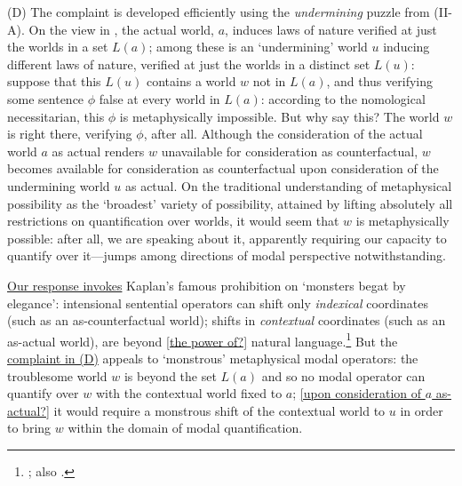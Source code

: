 \documentclass[12pt]{article}
\begin{document}
(D) The complaint is developed efficiently using the \emph{undermining} puzzle
from (II-A). On the view in \citep[sec.~4]{hmw}, the actual world, $a$,
induces laws of nature verified at just the worlds in a set $L(a)$; among
these is an `undermining' world $u$ inducing different laws of nature,
verified at just the worlds in a distinct set $L(u)$: suppose that this $L(u)$
contains a world $w$ not in $L(a)$, and thus verifying some sentence $\phi$
false at every world in $L(a)$: according to the nomological necessitarian,
this $\phi$ is metaphysically impossible. But why say this? The world $w$ is
right there, verifying $\phi$, after all.  Although the consideration of the
actual world $a$ as actual renders $w$ unavailable for consideration as
counterfactual, $w$ becomes available for consideration as counterfactual upon
consideration of the undermining world $u$ as actual.  On the traditional
understanding of metaphysical possibility as the `broadest' variety of
possibility, attained by lifting absolutely all restrictions on quantification
over worlds, it would seem that $w$ is metaphysically possible: after all, we
are speaking about it, apparently requiring our capacity to quantify over
it---jumps among directions of modal perspective notwithstanding.

\ul{Our response invokes} Kaplan's famous prohibition on `monsters begat by
elegance': intensional sentential operators can shift only \emph{indexical}
coordinates (such as an as-counterfactual world); shifts in \emph{contextual}
coordinates (such as an as-actual world), are beyond \ul{[the power of?]} 
natural
language.\footnote{\citep[sec.~VIII]{kaplan77};  also
\citep{lewis80icc,Israel1996-ISRWMD,Schlenker2002-SCHAPF-4,santorio12,Rabern2013-RABTMQ,stalnaker14}.}
But the \ul{complaint in (D)} appeals to `monstrous' metaphysical modal operators: the
troublesome world $w$ is beyond the set $L(a)$ and so no modal operator can
quantify over $w$ with the contextual world fixed to $a$; \ul{[upon
consideration of $a$ as-actual?]} it would require
a monstrous shift of the contextual world to $u$ in order to bring $w$ within
the domain of modal quantification.
\end{document}
